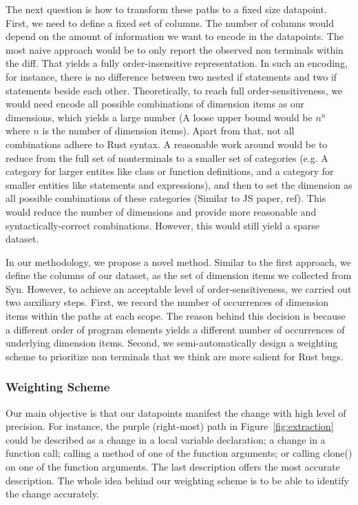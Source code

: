 The next question is how to transform these paths to a fixed size datapoint. First, we need to define a fixed set of columns. The number of columns would depend on the amount of information we want to encode in the datapoints. The most naive approach would be to only report the observed non terminals within the diff. That yields a fully order-insensitive representation. In such an encoding, for instance, there is no difference between two nested if statements and two if statements beside each other. Theoretically, to reach full order-sensitiveness, we would need encode all possible combinations of dimension items as our dimensions, which yields a large number (A loose upper bound would be $n^n$ where $n$ is the number of dimension items). Apart from that, not all combinations adhere to Rust syntax. A reasonable work around would be to reduce from the full set of nonterminals to a smaller set of categories (e.g. A category for larger entites like class or function definitions, and a category for smaller entities like statements and expressions), and then to set the dimension as all possible combinations of these categories (Similar to JS paper, ref). This would reduce the number of dimensions and provide more reasonable and syntactically-correct combinations. However, this would still yield a sparse dataset. 

In our methodology, we propose a novel method. Similar to the first approach, we define the columns of our dataset, as the set of dimension items we collected from Syn. However, to achieve an acceptable level of order-sensitiveness, we carried out two auxiliary steps. First, we record the number of occurrences of dimension items within the paths at each scope. The reason behind this decision is because a different order of program elements yields a different number of occurrences of underlying dimension items. Second, we semi-automatically design a weighting scheme to prioritize non terminals that we think are more salient for Rust bugs.

\subsubsection{Weighting Scheme}

Our main objective is that our datapoints manifest the change with high level of precision. For instance, the purple (right-most) path in Figure~\ref{fig:extraction} could be described as a change in a local variable declaration; a change in a function call; calling a method of one of the function arguments; or calling clone() on one of the function arguments. The last description offers the most accurate description. The whole idea behind our weighting scheme is to be able to identify the change accurately. 

